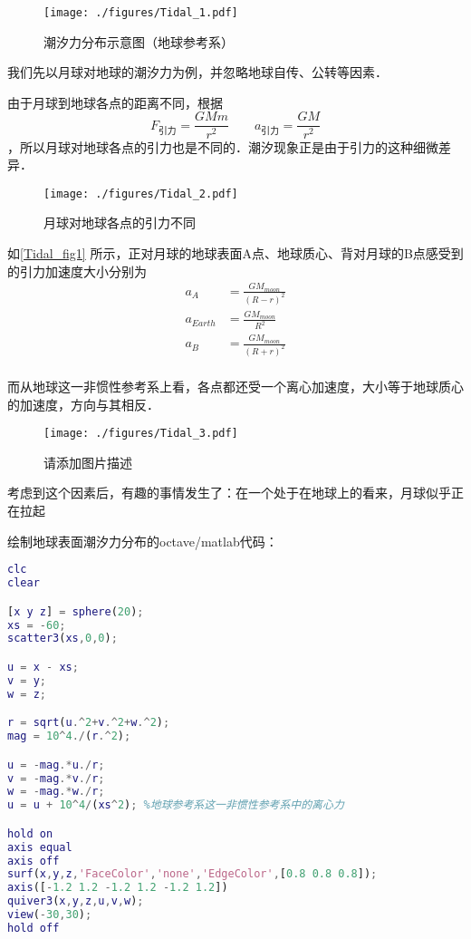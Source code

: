 
\begin{issues}
\issueDraft
\end{issues}
\begin{figure}[ht]
\centering
\texttt{[image: ./figures/Tidal\_1.pdf]}
\caption{潮汐力分布示意图（地球参考系）} \label{Tidal_fig1}
\end{figure}

我们先以月球对地球的潮汐力为例，并忽略地球自传、公转等因素．

由于月球到地球各点的距离不同，根据$$F_\text{引力}=\frac{GMm}{r^2} \qquad a_\text{引力}=\frac{GM}{r^2}$$，所以月球对地球各点的引力也是不同的．潮汐现象正是由于引力的这种细微差异．

\begin{figure}[ht]
\centering
\texttt{[image: ./figures/Tidal\_2.pdf]}
\caption{月球对地球各点的引力不同} \label{Tidal_fig2}
\end{figure}
如\autoref{Tidal_fig1} 所示，正对月球的地球表面A点、地球质心、背对月球的B点感受到的引力加速度大小分别为
\begin{equation}
\begin{aligned}
a_A &= \frac{GM_{moon}}{(R-r)^2}\\
a_{Earth} &= \frac{GM_{moon}}{R^2}\\
a_B &= \frac{GM_{moon}}{(R+r)^2}\\
\end{aligned}
\end{equation}

而从地球这一非惯性参考系上看，各点都还受一个离心加速度，大小等于地球质心的加速度，方向与其相反．
\begin{figure}[ht]
\centering
\texttt{[image: ./figures/Tidal\_3.pdf]}
\caption{请添加图片描述} \label{Tidal_fig3}
\end{figure}
考虑到这个因素后，有趣的事情发生了：在一个处于在地球上的看来，月球似乎正在拉起


绘制地球表面潮汐力分布的octave/matlab代码：
\begin{lstlisting}[language=matlab]
clc
clear

[x y z] = sphere(20);
xs = -60;
scatter3(xs,0,0);

u = x - xs;
v = y;
w = z;

r = sqrt(u.^2+v.^2+w.^2);
mag = 10^4./(r.^2);

u = -mag.*u./r;
v = -mag.*v./r;
w = -mag.*w./r;
u = u + 10^4/(xs^2); %地球参考系这一非惯性参考系中的离心力

hold on
axis equal
axis off
surf(x,y,z,'FaceColor','none','EdgeColor',[0.8 0.8 0.8]);
axis([-1.2 1.2 -1.2 1.2 -1.2 1.2])
quiver3(x,y,z,u,v,w);
view(-30,30);
hold off

\end{lstlisting}